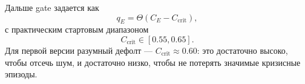 Дальше gate задается как
\begin{equation}
q_E = \Theta(C_E - C_{\mathrm{crit}}),
\end{equation}
с практическим стартовым диапазоном
\begin{equation}
C_{\mathrm{crit}} \in [0.55, 0.65].
\end{equation}
Для первой версии разумный дефолт — $C_{\mathrm{crit}} \approx 0.60$: это достаточно высоко, чтобы отсечь шум, и достаточно низко, чтобы не потерять значимые кризисные эпизоды.
